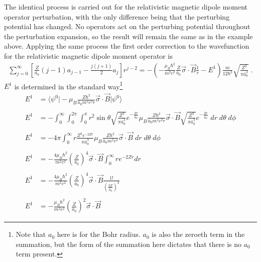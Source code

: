     The identical process is carried out for the relativistic magnetic dipole moment operator perturbation, with the only difference being that the perturbing potential has changed. No operators act on the perturbing potential throughout the perturbation expansion, so the result will remain the same as in the example above. Applying the same process the first order correction to the wavefunction for the relativistic magnetic dipole moment operator is \small
    \begin{align}
        \sum_{j = 0}^\infty \left[ \frac{Z}{\bar{a}_0}(j-1)a_{j-1} - \frac{j(j+1)}{2} a_j \right] r^{j-2} = -\left(- \frac{\mu_B \hbar^2}{m^2c^2} \frac{Z}{\bar{a}_0} \vec{\sigma} \cdot \vec{B} \frac{1}{r} - E^1 \right) \frac{m}{12 \hbar^2}\sqrt{\frac{Z^3}{\pi \bar{a}_0^3}}\;.
    \end{align}
    \normalsize
    \noindent $E^1$ is determined in the standard way\footnote{Note that $a_0$ here is for the Bohr radius. $a_0$ is also the zeroeth term in the summation, but the form of the summation here dictates that there is no $a_0$ term present.}
    \begin{align*}
        E^1 &= \langle \psi^0 \vert - \mu_B \frac{Z \hbar^2}{\bar{a}_0 m^2 c^2 r} \vec{\sigma} \cdot \vec{B} \vert \psi^0 \rangle \\ \nonumber \\
        E^1 &= -\int_0^\infty \int_0^{2\pi} \int_0^\pi r^2 \sin \theta \sqrt{\frac{Z^3}{\pi \bar{a}_0^3}} e^{-\frac{Zr}{\bar{a}_0}} \mu_B \frac{Z \hbar^2}{\bar{a}_0 m^2 c^2 r} \vec{\sigma} \cdot \vec{B} \sqrt{\frac{Z^3}{\pi \bar{a}_0^3}} e^{-\frac{Zr}{\bar{a}_0}}\;dr\;d\theta\;d\phi  \\\nonumber \\
        E^1 &= -4\pi \int_0^\infty r \frac{Z^3 e^{-2Zr}}{\pi \bar{a}_0^3} \mu_B \frac{Z \hbar^2}{\bar{a}_0 m^2 c^2} \vec{\sigma} \cdot \vec{B} \;dr\;d\theta\;d\phi\\\nonumber\\
        E^1 &= - \frac{4 \mu_B \hbar^2}{m^2 c^2} \left(\frac{Z}{\bar{a}_0} \right)^4\vec{\sigma} \cdot \vec{B} \int_0^\infty r e^{-2Zr} dr \\\nonumber \\
        E^1 &= - \frac{4 \mu_B \hbar^2}{m^2 c^2} \left(\frac{Z}{\bar{a}_0} \right)^4\vec{\sigma} \cdot \vec{B} \frac{1!}{(\frac{2Z}{\bar{a}_0})^2} \\\nonumber \\
        E^1 &= - \frac{\mu_B \hbar^2}{m^2 c^2} \left(\frac{Z}{\bar{a}_0} \right)^2\vec{\sigma} \cdot \vec{B}
    \end{align*}
